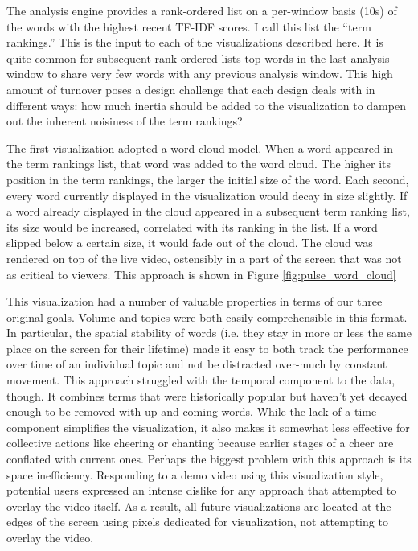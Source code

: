 The analysis engine provides a rank-ordered list on a per-window basis (10s) of the words with the highest recent TF-IDF scores. I call this list the ``term rankings.''  This is the input to each of the visualizations described here. It is quite common for subsequent rank ordered lists top words in the last analysis window to share very few words with any previous analysis window. This high amount of turnover poses a design challenge that each design deals with in different ways: how much inertia should be added to the visualization to dampen out the inherent noisiness of the term rankings? 



The first visualization adopted a word cloud model. When a word appeared in the term rankings list, that word was added to the word cloud. The higher its position in the term rankings, the larger the initial size of the word. Each second, every word currently displayed in the visualization would decay in size slightly. If a word already displayed in the cloud appeared in a subsequent term ranking list, its size would be increased, correlated with its ranking in the list. If a word slipped below a certain size, it would fade out of the cloud. The cloud was rendered on top of the live video, ostensibly in a part of the screen that was not as critical to viewers. This approach is shown in Figure \ref{fig:pulse_word_cloud}

This visualization had a number of valuable properties in terms of our three original goals. Volume and topics were both easily comprehensible in this format. In particular, the spatial stability of words (i.e. they stay in more or less the same place on the screen for their lifetime) made it easy to both track the performance over time of an individual topic and not be distracted over-much by constant movement. This approach struggled with the temporal component to the data, though. It combines terms that were historically popular but haven't yet decayed enough to be removed with up and coming words. While the lack of a time component simplifies the visualization, it also makes it somewhat less effective for collective actions like cheering or chanting because earlier stages of a cheer are conflated with current ones. Perhaps the biggest problem with this approach is its space inefficiency. Responding to a demo video using this visualization style, potential users expressed an intense dislike for any approach that attempted to overlay the video itself. As a result, all future visualizations are located at the edges of the screen using pixels dedicated for visualization, not attempting to overlay the video.

